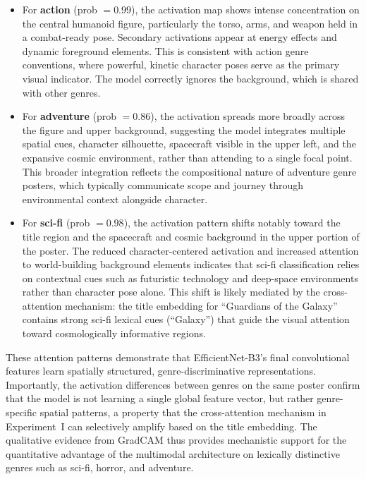 \documentclass[conference]{IEEEtran}
\begin{document}
\begin{itemize}
  \item For \textbf{action} (prob $= 0.99$), the activation map
        shows intense concentration on the central humanoid figure,
        particularly the torso, arms, and weapon held in a combat-ready
        pose. Secondary activations appear at energy effects and
        dynamic foreground elements. This is consistent with
        action genre conventions, where powerful, kinetic character
        poses serve as the primary visual indicator. The model
        correctly ignores the background, which is shared with
        other genres.

  \item For \textbf{adventure} (prob $= 0.86$), the activation
        spreads more broadly across the figure and upper background,
        suggesting the model integrates multiple spatial cues,
        character silhouette, spacecraft visible in the upper left,
        and the expansive cosmic environment, rather than attending
        to a single focal point. This broader integration reflects the
        compositional nature of adventure genre posters, which
        typically communicate scope and journey through environmental
        context alongside character.

  \item For \textbf{sci-fi} (prob $= 0.98$), the activation
        pattern shifts notably toward the title region and the
        spacecraft and cosmic background in the upper portion of
        the poster. The reduced character-centered activation and
        increased attention to world-building background elements
        indicates that sci-fi classification relies on contextual
        cues such as futuristic technology and deep-space environments
        rather than character pose alone. This shift is likely
        mediated by the cross-attention mechanism: the title
        embedding for ``Guardians of the Galaxy'' contains
        strong sci-fi lexical cues (``Galaxy'') that guide the
        visual attention toward cosmologically informative regions.
\end{itemize}

These attention patterns demonstrate that EfficientNet-B3's final
convolutional features learn spatially structured,
genre-discriminative representations. Importantly, the activation
differences between genres on the same poster confirm that the
model is not learning a single global feature vector, but rather
genre-specific spatial patterns, a property that the cross-attention
mechanism in Experiment~I can selectively amplify based on the title
embedding. The qualitative evidence from GradCAM thus provides
mechanistic support for the quantitative advantage of the multimodal
architecture on lexically distinctive genres such as sci-fi, horror,
and adventure.
\end{document}
